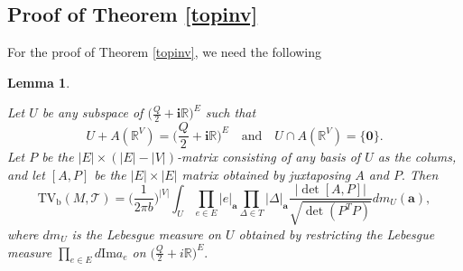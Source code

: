 \documentclass[11pt]{article}
\newtheorem{lemma}[theorem]{Lemma}
\theoremstyle{remark}
\theoremstyle{remark}
\numberwithin{equation}{section}
\begin{document}
\subsection{Proof of Theorem \ref{topinv}}

For the proof of Theorem \ref{topinv}, we need the following 
\begin{lemma}\label{P}


Let $U$ be any subspace of  $\big(\frac{Q}{2}+\mathbf i\mathbb R\big)^E$ such that
$$U + A(\mathbb R^V) = \bigg(\frac{Q}{2}+\mathbf i\mathbb R\bigg)^E\quad\text{and}\quad U\cap A(\mathbb R^V)=\{\boldsymbol 0\}.$$
 Let $P$ be the $|E|\times (|E|-|V|)$-matrix consisting of any basis of $U$ as the colums, and let $[A,P]$ be the $|E|\times |E|$ matrix obtained by juxtaposing  $A$ and $P.$ Then 
 $$
  \mathrm{TV_b}(M,\mathcal T)= \Big(\frac{1}{2\pi b}\Big)^{|V|} \int _ U \prod_{e\in E} |e|_{\boldsymbol{a}}\prod_{\Delta\in T}|\Delta|_{\boldsymbol a}\frac{\big|\det[A,P]\big|}{\sqrt{\det(P^T P)}}dm_U(\boldsymbol a),
 $$
where $dm_U$ is the Lebesgue measure on $U$ obtained by restricting the Lebesgue measure $\prod_{e\in E}d\mathrm{Im}a_e$ on $\big(\frac{Q}{2}+i\mathbb R\big)^E.$ 
\end{lemma}
\end{document}
